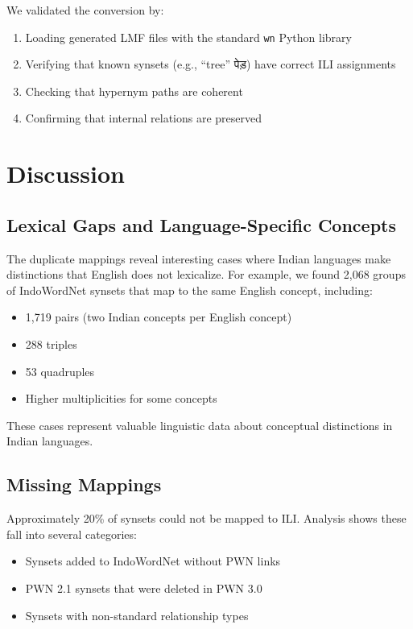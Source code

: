 \documentclass[11pt]{article}
\begin{document}
We validated the conversion by:
\begin{enumerate}
\item Loading generated LMF files with the standard \texttt{wn} Python library
\item Verifying that known synsets (e.g., ``tree'' पेड़) have correct ILI assignments
\item Checking that hypernym paths are coherent
\item Confirming that internal relations are preserved
\end{enumerate}

\section{Discussion}

\subsection{Lexical Gaps and Language-Specific Concepts}

The duplicate mappings reveal interesting cases where Indian languages make distinctions that English does not lexicalize.
For example, we found 2,068 groups of IndoWordNet synsets that map to the same English concept, including:
\begin{itemize}
\item 1,719 pairs (two Indian concepts per English concept)
\item 288 triples
\item 53 quadruples
\item Higher multiplicities for some concepts
\end{itemize}

These cases represent valuable linguistic data about conceptual distinctions in Indian languages.

\subsection{Missing Mappings}

Approximately 20\% of synsets could not be mapped to ILI.
Analysis shows these fall into several categories:
\begin{itemize}
\item Synsets added to IndoWordNet without PWN links
\item PWN 2.1 synsets that were deleted in PWN 3.0
\item Synsets with non-standard relationship types
\end{itemize}
\end{document}

